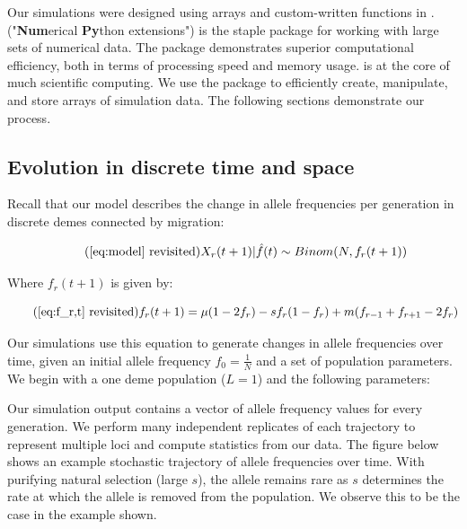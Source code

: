 Our simulations were designed using  arrays and custom-written functions in .  ("\textbf{Num}erical \textbf{Py}thon extensions") is the staple  package for working with large sets of numerical data. The package demonstrates superior computational efficiency, both in terms of processing speed and memory usage.  is at the core of much scientific computing.\cite{van_der_walt_numpy_2011} We use the package to efficiently create, manipulate, and store arrays of simulation data. The following sections demonstrate our process. 


\subsection{Evolution in discrete time and space}

Recall that our model describes the change in allele frequencies per generation in discrete demes connected by migration:

\begin{equation}
    \tag{\ref{eq:model} revisited}
    X_r(t+1) | \hat{f}(t) \sim Binom(N,f_r(t+1))
\end{equation}

Where $f_r(t+1)$ is given by:

\begin{equation}
    \tag{\ref{eq:f_r,t} revisited}
    f_r(t+1) = \mu(1-2f_r)-sf_r (1-f_r) + m (f_{r-1}+f_{r+1}-2f_r)
\end{equation}

Our simulations use this equation to generate changes in allele frequencies over time, given an initial allele frequency $f_0 = \frac{1}{N}$ and a set of population parameters. We begin with a one deme population ($L = 1$) and the following parameters:

 

Our simulation output contains a vector of allele frequency values for every generation. We perform many independent replicates of each trajectory to represent multiple loci and compute statistics from our data. The figure below shows an example stochastic trajectory of allele frequencies over time. With purifying natural selection (large $s$), the allele remains rare as $s$ determines the rate at which the allele is removed from the population. We observe this to be the case in the example shown.


